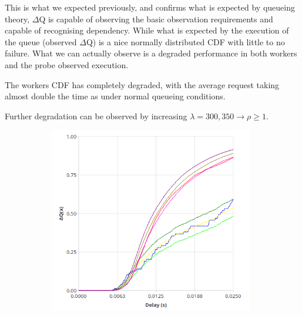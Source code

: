     This is what we expected previously, and confirms what is expected by queueing theory, $\Delta$Q is capable of observing the basic observation requirements and capable of recognising dependency. While what is expected by the execution of the queue (observed $\Delta$Q) is a nice normally distributed CDF with little to no failure. What we can actually observe is a degraded performance in both workers and the probe observed execution.

    The workers CDF has completely degraded, with the average request taking almost double the time as under normal queueing conditions. 

    Further degradation can be observed by increasing $\lambda = {300, 350} \rightarrow \rho \ge 1$.

    \begin{figure}[H]
            \centering
            \begin{subfigure}{.5\textwidth}
                \centering
                \includegraphics[width=0.98\textwidth]{img/overload_2/300_probe.png}
                \label{fig:high_load_1}
            \end{subfigure}%
            \begin{subfigure}{.5\textwidth}
                \centering

\end{subfigure}
\end{figure}
